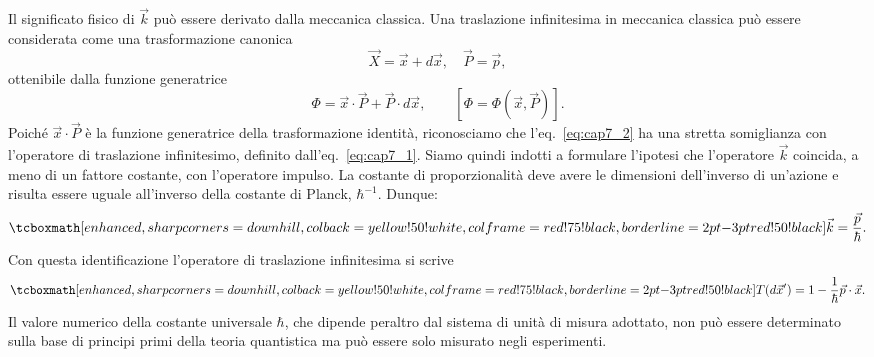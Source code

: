 Il significato fisico di $\vec{k}$ può essere derivato dalla meccanica classica. Una traslazione infinitesima in meccanica classica può essere considerata come una trasformazione canonica
	\begin{equation}
		\vec{X}= \vec{x}+ d\vec{x}, \quad \vec{P}= \vec{p} ,
	\end{equation}
ottenibile dalla funzione generatrice
	\begin{equation}
		\label{eq:cap7_2}
		\Phi = \vec{x}\cdot \vec{P}+\vec{P}\cdot d\vec{x} ,\qquad\left[\Phi=\Phi ( \vec{x}, \vec{P} ) \right].
	\end{equation}
Poiché $\vec{x} \cdot \vec{P}$ è la funzione generatrice della trasformazione identità, riconosciamo che l'eq.~\eqref{eq:cap7_2} ha una stretta somiglianza con l'operatore di traslazione infinitesimo, definito dall'eq.~\eqref{eq:cap7_1}. Siamo quindi indotti a  formulare l'ipotesi che l'operatore $\vec{k}$ coincida, a meno di un fattore costante, con l'operatore impulso. La costante di proporzionalità deve avere le dimensioni dell'inverso di un'azione e risulta essere uguale all'inverso della costante di Planck, $\hbar ^{-1}$. Dunque:
	\begin{equation}
		\tcboxmath[enhanced,sharp corners=downhill ,colback=yellow!50!white,colframe=red!75!black, borderline={2pt}{-3pt}{red!50!black}]{	
			\vec{k}=\frac{\vec{p}}{\hbar}.
			}
	\end{equation}
Con questa identificazione l'operatore di traslazione infinitesima si scrive
	\begin{equation}
		\label{eq:cap7_3}
		\tcboxmath[enhanced,sharp corners=downhill ,colback=yellow!50!white,colframe=red!75!black, borderline={2pt}{-3pt}{red!50!black}]{	
			T(d\vec{x}') = 1-\frac{1}{\hbar}\vec{p}\cdot\vec{x}.
			}
	\end{equation}
Il valore numerico della costante universale $\hbar$, che dipende peraltro dal sistema di unità di misura adottato, non può essere determinato sulla base di principi primi della teoria quantistica ma può essere solo misurato negli esperimenti. \\

